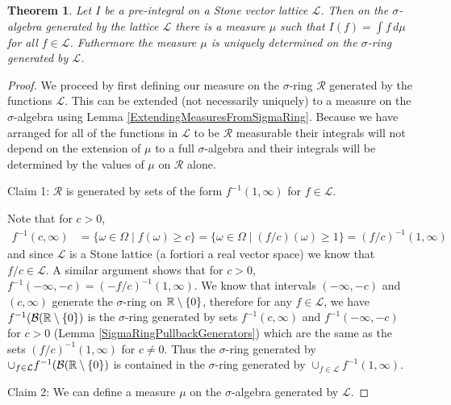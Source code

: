 \documentclass{amsart}
\newtheorem{thm}{Theorem}[section]
\theoremstyle{remark}
\theoremstyle{definition}
\begin{document}
\begin{thm}\label{DaniellStoneTheorem}Let $I$ be a pre-integral on a Stone vector lattice
  $\mathcal{L}$.  Then on the $\sigma$-algebra generated by the
  lattice $\mathcal{L}$ there is a measure $\mu$ such that $I(f) =
  \int f \, d\mu$ for all $f \in \mathcal{L}$.  Futhermore the measure
  $\mu$ is uniquely determined on the $\sigma$-ring generated by $\mathcal{L}$.
\end{thm}
\begin{proof}
We proceed by first defining our measure on the $\sigma$-ring
$\mathcal{R}$ generated by the functions $\mathcal{L}$.  This can be extended (not
necessarily uniquely) to a measure on the $\sigma$-algebra using Lemma \ref{ExtendingMeasuresFromSigmaRing}.
Because we have arranged for all of the functions in $\mathcal{L}$ to
be $\mathcal{R}$ measurable their integrals will not depend on the
extension of $\mu$ to a full $\sigma$-algebra and their integrals will
be determined by the values of $\mu$ on $\mathcal{R}$ alone.

Claim 1: $\mathcal{R}$ is generated by sets of the form $f^{-1}(1,
\infty)$ for $f \in \mathcal{L}$.

Note that for $c > 0$, 
\begin{align*}
f^{-1}(c, \infty) &= 
\lbrace \omega \in \Omega \mid f(\omega) \geq c \rbrace = 
\lbrace \omega \in \Omega \mid \left(f/c\right)(\omega) \geq 1 \rbrace =
\left(f/c\right)^{-1}(1, \infty)
\end{align*}
and since $\mathcal{L}$ is a Stone lattice (a fortiori a real vector
space) we know that $f/c \in \mathcal{L}$.  A similar argument
shows that for $c > 0$, $f^{-1}(-\infty, -c) = (-f/c)^{-1}(1,
\infty)$.  We know that intervals $(-\infty, -c)$ and $(c, \infty)$
generate the $\sigma$-ring on $\mathbb{R} \setminus \lbrace 0 \rbrace$,
therefore for any $f \in \mathcal{L}$, we have
$f^{-1}(\mathcal{B}(\mathbb{R}\setminus \lbrace 0 \rbrace)$ is the
$\sigma$-ring generated by sets $f^{-1}(c, \infty)$ and
$f^{-1}(-\infty, -c)$ for $c > 0$
(Lemma \ref{SigmaRingPullbackGenerators}) which are the same as the sets
$(f/c)^{-1}(1, \infty)$ for $c \neq 0$. Thus the $\sigma$-ring generated by $\cup_{f
  \in \mathcal{L}} f^{-1}(\mathcal{B}(\mathbb{R}\setminus \lbrace 0
\rbrace)$ is contained in the $\sigma$-ring generated by $\cup_{f \in
  \mathcal{L}} f^{-1}(1, \infty)$.

Claim 2: We can define a measure $\mu$ on the $\sigma$-algebra
generated by $\mathcal{L}$.


\end{proof}
\end{document}
